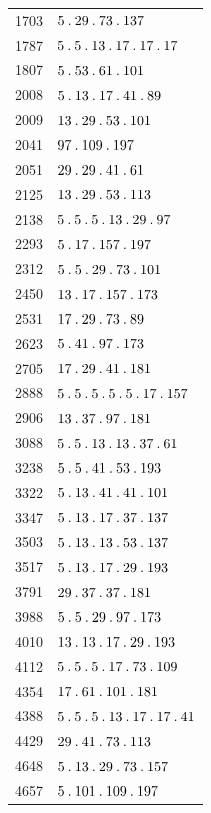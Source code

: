 \begin{longtable}{@{}r|l@{}}
1703 & $5\mathbin{.} 29\mathbin{.} 73\mathbin{.} 137$\\
1787 & $5\mathbin{.} 5\mathbin{.} 13\mathbin{.} 17\mathbin{.} 17\mathbin{.} 17$\\
1807 & $5\mathbin{.} 53\mathbin{.} 61\mathbin{.} 101$\\
2008 & $5\mathbin{.} 13\mathbin{.} 17\mathbin{.} 41\mathbin{.} 89$\\
2009 & $13\mathbin{.} 29\mathbin{.} 53\mathbin{.} 101$\\
2041 & $97\mathbin{.} 109\mathbin{.} 197$\\
2051 & $29\mathbin{.} 29\mathbin{.} 41\mathbin{.} 61$\\
2125 & $13\mathbin{.} 29\mathbin{.} 53\mathbin{.} 113$\\
2138 & $5\mathbin{.} 5\mathbin{.} 5\mathbin{.} 13\mathbin{.} 29\mathbin{.} 97$\\
2293 & $5\mathbin{.} 17\mathbin{.} 157\mathbin{.} 197$\\
2312 & $5\mathbin{.} 5\mathbin{.} 29\mathbin{.} 73\mathbin{.} 101$\\
2450 & $13\mathbin{.} 17\mathbin{.} 157\mathbin{.} 173$\\
2531 & $17\mathbin{.} 29\mathbin{.} 73\mathbin{.} 89$\\
2623 & $5\mathbin{.} 41\mathbin{.} 97\mathbin{.} 173$\\
2705 & $17\mathbin{.} 29\mathbin{.} 41\mathbin{.} 181$\\
2888 & $5\mathbin{.} 5\mathbin{.} 5\mathbin{.} 5\mathbin{.} 5\mathbin{.} 17\mathbin{.} 157$\\
2906 & $13\mathbin{.} 37\mathbin{.} 97\mathbin{.} 181$\\
3088 & $5\mathbin{.} 5\mathbin{.} 13\mathbin{.} 13\mathbin{.} 37\mathbin{.} 61$\\
3238 & $5\mathbin{.} 5\mathbin{.} 41\mathbin{.} 53\mathbin{.} 193$\\
3322 & $5\mathbin{.} 13\mathbin{.} 41\mathbin{.} 41\mathbin{.} 101$\\
3347 & $5\mathbin{.} 13\mathbin{.} 17\mathbin{.} 37\mathbin{.} 137$\\
3503 & $5\mathbin{.} 13\mathbin{.} 13\mathbin{.} 53\mathbin{.} 137$\\
3517 & $5\mathbin{.} 13\mathbin{.} 17\mathbin{.} 29\mathbin{.} 193$\\
3791 & $29\mathbin{.} 37\mathbin{.} 37\mathbin{.} 181$\\
3988 & $5\mathbin{.} 5\mathbin{.} 29\mathbin{.} 97\mathbin{.} 173$\\
4010 & $13\mathbin{.} 13\mathbin{.} 17\mathbin{.} 29\mathbin{.} 193$\\
4112 & $5\mathbin{.} 5\mathbin{.} 5\mathbin{.} 17\mathbin{.} 73\mathbin{.} 109$\\
4354 & $17\mathbin{.} 61\mathbin{.} 101\mathbin{.} 181$\\
4388 & $5\mathbin{.} 5\mathbin{.} 5\mathbin{.} 13\mathbin{.} 17\mathbin{.} 17\mathbin{.} 41$\\
4429 & $29\mathbin{.} 41\mathbin{.} 73\mathbin{.} 113$\\
4648 & $5\mathbin{.} 13\mathbin{.} 29\mathbin{.} 73\mathbin{.} 157$\\
4657 & $5\mathbin{.} 101\mathbin{.} 109\mathbin{.} 197$\\

\end{longtable}
